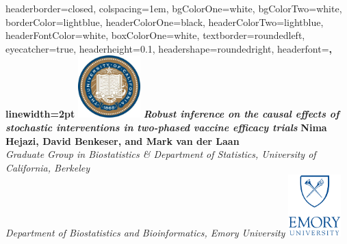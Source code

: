 \documentclass[landscape,a0paper,fontscale=0.285]{baposter} %
\begin{document}
\begin{poster} {
headerborder=closed, %
colspacing=1em, %
bgColorOne=white, %
bgColorTwo=white, %
borderColor=lightblue, %
headerColorOne=black, %
headerColorTwo=lightblue, %
headerFontColor=white, %
boxColorOne=white, %
textborder=roundedleft, %
eyecatcher=true, %
headerheight=0.1\textheight, %
headershape=roundedright, %
headerfont=\Large\bf\textsc, %
linewidth=2pt %
}
%
{\includegraphics[height=6.5em]{logo_berkeley.jpg}} %
{\bf\textit{\LARGE Robust inference on the causal effects of stochastic
    interventions in two-phased vaccine efficacy
    trials}\vspace{0.01em}} %
{\textbf{Nima Hejazi, David Benkeser, and Mark van der Laan} \\
  \textit{Graduate Group in Biostatistics \& Department of Statistics,
    University of California, Berkeley} \\
  \textit{Department of Biostatistics and Bioinformatics, Emory University}}
{\includegraphics[height=6.5em]{logo_emory.jpg}} %


\end{poster}
\end{document}
